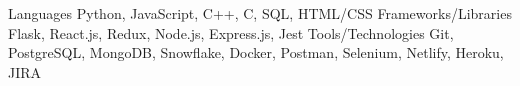 
\begin{cvskills}
  \cvskill
    {Languages} %
    {Python, JavaScript, C++, C, SQL, HTML/CSS} %
  \cvskill
    {Frameworks/Libraries} %
    {Flask, React.js, Redux, Node.js, Express.js, Jest} %
  \cvskill
    {Tools/Technologies} %
    {Git, PostgreSQL, MongoDB, Snowflake, Docker, Postman, Selenium, Netlify, Heroku, JIRA} %
\end{cvskills}
